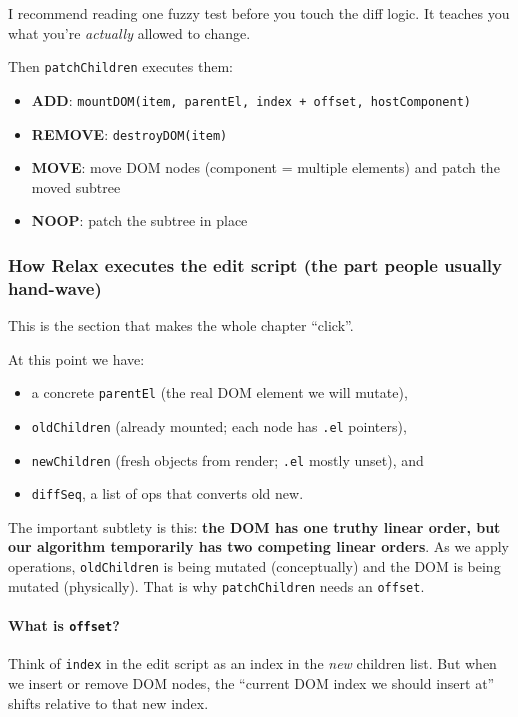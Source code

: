 I recommend reading one fuzzy test before you touch the diff logic.
It teaches you what you're \emph{actually} allowed to change.

Then \texttt{patchChildren} executes them:

\begin{itemize}
  \item \textbf{ADD}: \texttt{mountDOM(item, parentEl, index + offset, hostComponent)}
  \item \textbf{REMOVE}: \texttt{destroyDOM(item)}
  \item \textbf{MOVE}: move DOM nodes (component = multiple elements) and patch the moved subtree
  \item \textbf{NOOP}: patch the subtree in place
\end{itemize}

\subsubsection*{How Relax executes the edit script (the part people usually hand-wave)}

This is the section that makes the whole chapter ``click''.

At this point we have:

\begin{itemize}
  \item a concrete \texttt{parentEl} (the real DOM element we will mutate),
  \item \texttt{oldChildren} (already mounted; each node has \texttt{.el} pointers),
  \item \texttt{newChildren} (fresh objects from render; \texttt{.el} mostly unset), and
  \item \texttt{diffSeq}, a list of ops that converts old \textrightarrow{} new.
\end{itemize}

The important subtlety is this: \textbf{the DOM has one truthy linear order, but our algorithm temporarily has two competing linear orders}.
As we apply operations, \texttt{oldChildren} is being mutated (conceptually) and the DOM is being mutated (physically).
That is why \texttt{patchChildren} needs an \texttt{offset}.

\paragraph{What is \texttt{offset}?}

Think of \texttt{index} in the edit script as an index in the \emph{new} children list.
But when we insert or remove DOM nodes, the ``current DOM index we should insert at'' shifts relative to that new index.

